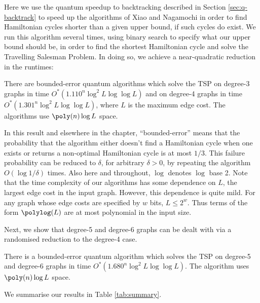 Here we use the quantum speedup to backtracking described in Section \ref{sec:q-backtrack} to speed up the algorithms of Xiao and Nagamochi in order to find Hamiltonian cycles shorter than a given upper bound, if such cycles do exist. We run this algorithm several times, using binary search to specify what our upper bound should be, in order to find the shortest Hamiltonian cycle and solve the Travelling Salesman Problem. In doing so, we achieve a near-quadratic reduction in the runtimes:

\begin{theorem}
There are bounded-error quantum algorithms which solve the TSP on degree-3 graphs in time $O^*(1.110^n \log^2 L \log \log L)$ and on degree-4 graphs in time $O^*(1.301^n \log^2 L \log \log L)$, where $L$ is the maximum edge cost. The algorithms use $\poly(n)\log L$ space.
\label{thm:deg34}
\end{theorem}

In this result and elsewhere in the chapter, ``bounded-error'' means that the probability that the algorithm either doesn't find a Hamiltonian cycle when one exists or returns a non-optimal Hamiltonian cycle is at most $1/3$. This failure probability can be reduced to $\delta$, for arbitrary $\delta > 0$, by repeating the algorithm $O(\log 1/\delta)$ times. Also here and throughout, $\log$ denotes $\log$ base 2. Note that the time complexity of our algorithms has some dependence on $L$, the largest edge cost in the input graph. However, this dependence is quite mild. For any graph whose edge costs are specified by $w$ bits, $L \le 2^w$. Thus terms of the form $\polylog(L)$ are at most polynomial in the input size.

Next, we show that degree-5 and degree-6 graphs can be dealt with via a randomised reduction to the degree-4 case.

\begin{theorem}
\label{thm:deg6}
There is a bounded-error quantum algorithm which solves the TSP on degree-5 and degree-6 graphs in time $O^*(1.680^n\log^2 L \log \log L)$. The algorithm uses $\poly(n)\log L$ space.
\end{theorem}

We summarise our results in Table \ref{tab:summary}.

